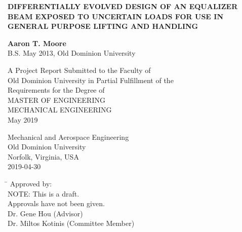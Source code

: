 \begin{titlepage}
   \begin{center}
       \vspace*{1cm}
       
       \Large
	   {\uppercase{\textbf{Differentially Evolved Design of an Equalizer Beam Exposed to Uncertain Loads for use in General Purpose Lifting and Handling}}\par}
       \normalsize

       \vspace{2.5cm}
 
       \textbf{Aaron T. Moore}\\
       B.S. May 2013, Old Dominion University
 
       \vfill
 
       A Project Report Submitted to the Faculty of\\
       Old Dominion University in Partial Fulfillment of the\\
       Requirements for the Degree of\\
       \vspace{1.0cm}
       \uppercase{Master of Engineering}\\
       \vspace{1em}
       \uppercase{Mechanical Engineering}\\
       \vspace{1em}
       {May 2019}\\

 
       \vspace{0.8cm}
 
 
       Mechanical  and Aerospace Engineering\\
       Old Dominion University\\
       Norfolk, Virginia, USA\\
       2019-04-30
 
   \end{center}
   \vspace{1cm}
   \begin{tabbing}
      \hspace*{11cm}\= \kill
      \>Approved by:\\
      \>NOTE: This is a draft.\\
      \>Approvals have not been given.\\
      \>Dr. Gene Hou (Advisor)\\
      \>Dr. Miltos Kotinis (Committee Member)
   \end{tabbing}
\end{titlepage}
